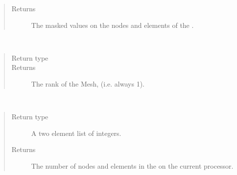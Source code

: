 \documentclass[letterpaper,10pt,english]{sphinxmanual}
\begin{document}
\begin{fulllineitems}
\begin{fulllineitems}
\begin{quote}
\begin{description}
\item[{Returns}] \leavevmode
The masked values on the nodes and elements of the
{\hyperref[\detokenize{mesh:ESMF.api.mesh.Mesh}]{}}.

\end{description}\end{quote}

\end{fulllineitems}


\begin{fulllineitems}
\label{\detokenize{mesh:ESMF.api.mesh.Mesh.rank}}~\begin{quote}\begin{description}
\item[{Return type}] \leavevmode
{}

\item[{Returns}] \leavevmode
The rank of the Mesh, (i.e. always 1).

\end{description}\end{quote}

\end{fulllineitems}


\begin{fulllineitems}
\label{\detokenize{mesh:ESMF.api.mesh.Mesh.size}}~\begin{quote}\begin{description}
\item[{Return type}] \leavevmode
A two element list of integers.

\item[{Returns}] \leavevmode
The number of nodes and elements in the {\hyperref[\detokenize{mesh:ESMF.api.mesh.Mesh}]{}} on the current
processor.

\end{description}\end{quote}


\end{fulllineitems}
\end{fulllineitems}
\end{document}
